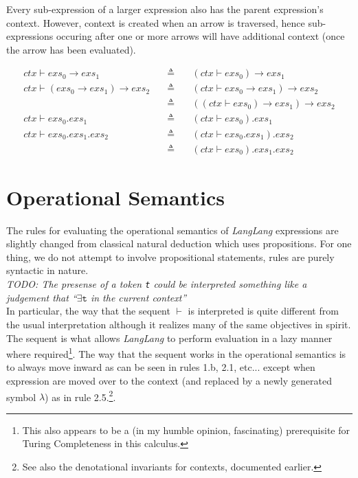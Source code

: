 \documentclass[a4paper,11pt]{article}
\begin{document}
Every sub-expression of a larger expression also has the parent expression's context.
However, context is created when an arrow is traversed, hence sub-expressions occuring after one or more arrows will have additional context (once the arrow has been evaluated).

\begin{eqnarray*}
ctx \vdash exs_0 \rightarrow exs_1 \quad&\triangleq&\quad (ctx \vdash exs_0) \rightarrow exs_1 \\
ctx \vdash (exs_0 \rightarrow exs_1) \rightarrow exs_2 \quad&\triangleq&\quad (ctx \vdash exs_0 \rightarrow exs_1) \rightarrow exs_2 \\
                                                            &\triangleq&\quad ((ctx \vdash exs_0) \rightarrow exs_1) \rightarrow exs_2 \\
ctx \vdash exs_0.exs_1 \quad&\triangleq&\quad (ctx \vdash exs_0).exs_1 \\
ctx \vdash exs_0.exs_1.exs_2 \quad&\triangleq&\quad (ctx \vdash exs_0.exs_1).exs_2 \\
                                  &\triangleq&\quad (ctx \vdash exs_0).exs_1.exs_2
\end{eqnarray*}

\section{Operational Semantics}
The rules for evaluating the operational semantics of \textsl{LangLang} expressions are slightly changed from classical natural deduction which uses propositions.
For one thing, we do not attempt to involve propositional statements, rules are purely syntactic in nature.\\
\emph{TODO: The presense of a token \texttt{t} could be interpreted something like a judgement that ``$\exists\mathtt{t}$ in the current context''}\\

In particular, the way that the sequent $\vdash$ is interpreted is quite different from the usual interpretation although it realizes many of the same objectives in spirit.
The sequent is what allows \textsl{LangLang} to perform evaluation in a lazy manner where required\footnote{This also appears to be a (in my humble opinion, fascinating) prerequisite for Turing Completeness in this calculus.}.
The way that the sequent works in the operational semantics is to always move inward as can be seen in rules 1.b, 2.1, etc... except when expression are moved over to the context (and replaced by a newly generated symbol $\lambda$) as in rule 2.5.\footnote{See also the denotational invariants for contexts, documented earlier.}.
\end{document}
